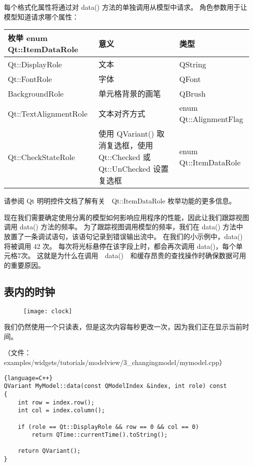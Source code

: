 每个格式化属性将通过对 data() 方法的单独调用从模型中请求。
角色参数用于让模型知道请求哪个属性：

\begin{tabular}{|l|m{15em}|l|}
	\hline
	枚举 enum Qt::ItemDataRole & 意义 &类型 \\
	\hline
	Qt::DisplayRole	 & 文本	 &QString \\
	\hline
	Qt::FontRole	& 字体	&QFont\\ 
	\hline
	BackgroundRole &	单元格背景的画笔	& QBrush\\ 
	\hline
	Qt::TextAlignmentRole	& 文本对齐方式 &enum Qt::AlignmentFlag \\
	\hline 
	Qt::CheckStateRole &	使用 QVariant() 取消复选框，使用 Qt::Checked 或 Qt::UnChecked 设置复选框 &	enum Qt::ItemDataRole \\
	\hline
\end{tabular}

请参阅 Qt 明明控件文档了解有关　Qt::ItemDataRole 枚举功能的更多信息。

现在我们需要确定使用分离的模型如何影响应用程序的性能，因此让我们跟踪视图调用 data() 方法的频率。
为了跟踪视图调用模型的频率，我们在 data() 方法中放置了一条调试语句，该语句记录到错误输出流中。
在我们的小示例中，data() 将被调用 42 次。
每次将光标悬停在该字段上时，都会再次调用 data()，每个单元格7次。
这就是为什么在调用　data()　和缓存昂贵的查找操作时确保数据可用的重要原因。

\subsection{表内的时钟}

\begin{figure}[hbt!]  
\texttt{[image: clock]}
\end{figure}

我们仍然使用一个只读表，但是这次内容每秒更改一次，因为我们正在显示当前时间。

（文件：examples/widgets/tutorials/modelview/3\_changingmodel/mymodel.cpp）

\begin{lstlisting}{language=C++}
QVariant MyModel::data(const QModelIndex &index, int role) const
{
    int row = index.row();
    int col = index.column();

    if (role == Qt::DisplayRole && row == 0 && col == 0)
        return QTime::currentTime().toString();

    return QVariant();
}
\end{lstlisting}

